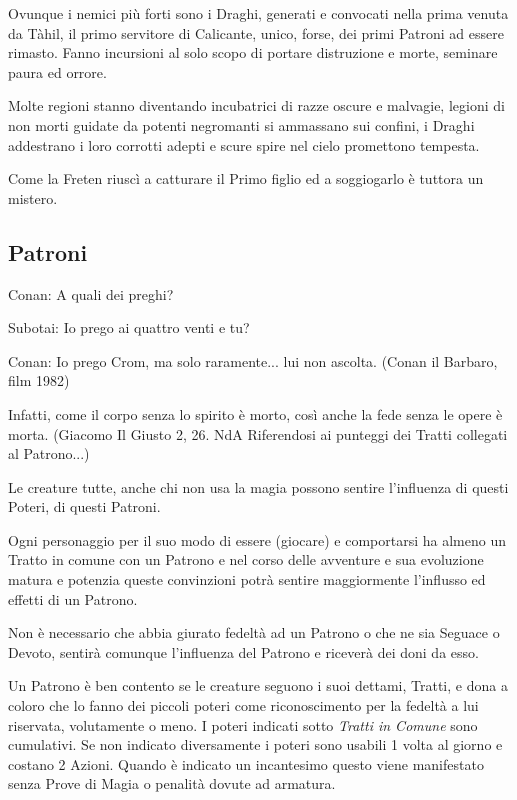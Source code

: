 \begin{multicols}{2}
Ovunque i nemici più forti sono i Draghi, generati e convocati nella prima venuta da Tàhil, il primo servitore di Calicante, unico, forse, dei primi Patroni ad essere rimasto.
Fanno incursioni al solo scopo di portare distruzione e morte, seminare paura ed orrore.

Molte regioni stanno diventando incubatrici di razze oscure e malvagie, legioni di non morti guidate da potenti negromanti si ammassano sui confini, i Draghi addestrano i loro corrotti adepti e scure spire nel cielo promettono tempesta.

Come la Freten riuscì a catturare il Primo figlio ed a soggiogarlo è tuttora un mistero.

\subsection{Patroni}\hypertarget{patroni}{}\label{patroni}

\begin{enfasi}{
Conan: A quali dei preghi?

Subotai: Io prego ai quattro venti e tu?

Conan: Io prego Crom, ma solo raramente... lui non ascolta. (Conan il Barbaro, film 1982)

\medskip

Infatti, come il corpo senza lo spirito è morto, così anche la fede senza le opere è morta. (Giacomo Il Giusto 2, 26. NdA Riferendosi ai punteggi dei Tratti collegati al Patrono...)
}
\end{enfasi}

Le creature tutte, anche chi non usa la magia possono sentire l'influenza di questi Poteri, di questi Patroni.

Ogni personaggio per il suo modo di essere (giocare) e comportarsi ha almeno un Tratto in comune con un Patrono e nel corso delle avventure e sua evoluzione matura e potenzia queste convinzioni potrà sentire maggiormente l'influsso ed effetti di un Patrono.

Non è necessario che abbia giurato fedeltà ad un Patrono o che ne sia Seguace o Devoto, sentirà comunque l'influenza del Patrono e riceverà dei doni da esso.

Un Patrono è ben contento se le creature seguono i suoi dettami, Tratti, e dona a coloro che lo fanno dei piccoli poteri come riconoscimento per la fedeltà a lui riservata, volutamente o meno. I poteri indicati sotto \emph{Tratti in Comune} sono cumulativi. Se non indicato diversamente i poteri sono usabili 1 volta al giorno e costano 2 Azioni.
Quando è indicato un incantesimo questo viene manifestato senza Prove di Magia o penalità dovute ad armatura.


\end{multicols}
